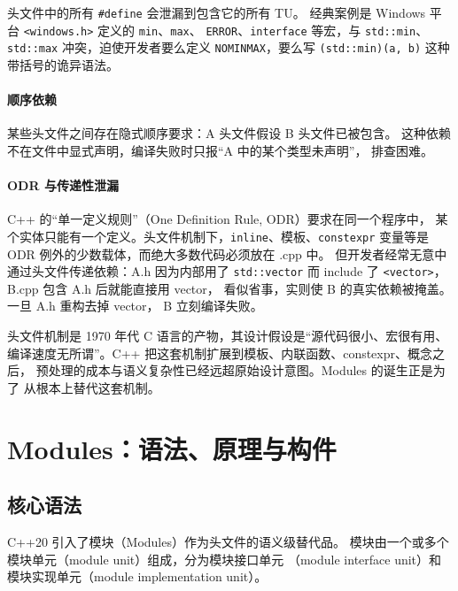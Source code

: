 \documentclass[12pt,a4paper,fontset=fandol]{ctexbook}
\newcommand{\flag}[1]{\texttt{#1}}
\begin{document}
头文件中的所有 \flag{\#define} 会泄漏到包含它的所有 TU。
经典案例是 Windows 平台 \texttt{<windows.h>} 定义的 \texttt{min}、\texttt{max}、
\texttt{ERROR}、\texttt{interface} 等宏，与 \texttt{std::min}、\texttt{std::max}
冲突，迫使开发者要么定义 \texttt{NOMINMAX}，要么写
\texttt{(std::min)(a, b)} 这种带括号的诡异语法。

\subsection{顺序依赖}

某些头文件之间存在隐式顺序要求：A 头文件假设 B 头文件已被包含。
这种依赖不在文件中显式声明，编译失败时只报“A 中的某个类型未声明”，
排查困难。

\subsection{ODR 与传递性泄漏}

C++ 的“单一定义规则”（One Definition Rule, ODR）要求在同一个程序中，
某个实体只能有一个定义。头文件机制下，\texttt{inline}、模板、\texttt{constexpr}
变量等是 ODR 例外的少数载体，而绝大多数代码必须放在 .cpp 中。
但开发者经常无意中通过头文件传递依赖：A.h 因为内部用了 \texttt{std::vector}
而 include 了 \texttt{<vector>}，B.cpp 包含 A.h 后就能直接用 vector，
看似省事，实则使 B 的真实依赖被掩盖。一旦 A.h 重构去掉 vector，
B 立刻编译失败。

\begin{note}[title=头文件机制的本质局限]
头文件机制是 1970 年代 C 语言的产物，其设计假设是“源代码很小、宏很有用、
编译速度无所谓”。C++ 把这套机制扩展到模板、内联函数、constexpr、概念之后，
预处理的成本与语义复杂性已经远超原始设计意图。Modules 的诞生正是为了
从根本上替代这套机制。
\end{note}

\part{Modules：语法、原理与构件}

\chapter{核心语法}

C++20 引入了模块（Modules）作为头文件的语义级替代品。
模块由一个或多个模块单元（module unit）组成，分为模块接口单元
（module interface unit）和模块实现单元（module implementation unit）。
\end{document}
